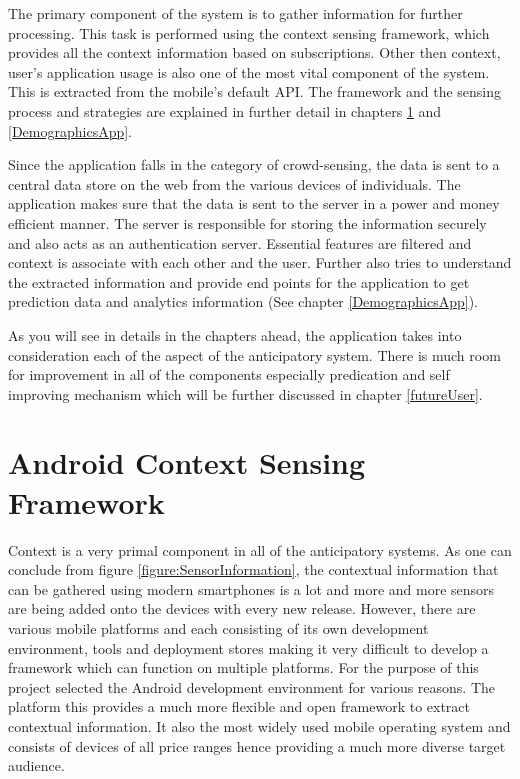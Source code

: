 \documentclass[12pt]{report}
\begin{document}
The primary component of the system is to gather information for further processing. This task is performed using the context sensing framework, which provides all the context information based on subscriptions. Other then context, user's application usage is also one of the most vital component of the system. This is extracted from the mobile's default API. The framework and the sensing process and strategies are explained in further detail in chapters \ref{ContextSensingFramework} and \ref{DemographicsApp}.

Since the application falls in the category of crowd-sensing, the data is sent to a central data store on the web from the various devices of individuals. The application makes sure that the data is sent to the server in a power and money efficient manner. The server is responsible for storing the information securely and also acts as an authentication server. Essential features are filtered and context is associate with each other and the user. Further also tries to understand the extracted information and provide end points for the application to get prediction data and analytics information (See chapter \ref{DemographicsApp}).

As you will see in details in the chapters ahead, the application takes into consideration each of the aspect of the anticipatory system. There is much room for improvement in all of the components especially predication and self improving mechanism which will be further discussed in chapter \ref{futureUser}.


\chapter{Android Context Sensing Framework}
\label{ContextSensingFramework}
Context is a very primal component in all of the anticipatory systems. As one can conclude from figure \ref{figure:SensorInformation}, the contextual information that can be gathered using modern smartphones is a lot and more and more sensors are being added onto the devices with every new release. However, there are various mobile platforms and each consisting of its own development environment, tools and deployment stores making it very difficult to develop a framework which can function on multiple platforms. For the purpose of this project selected the Android development environment for various reasons. The platform this provides a much more flexible and open framework to extract contextual information. It also the most widely used mobile operating system and consists of devices of all price ranges hence providing a much more diverse target audience.
\end{document}
